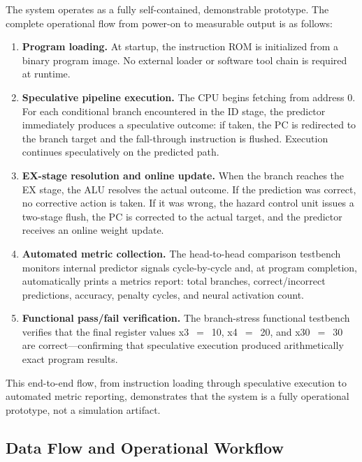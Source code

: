 \documentclass[12pt,a4paper]{article}
\begin{document}
The system operates as a fully self-contained, demonstrable prototype. The
complete operational flow from power-on to measurable output is as follows:

\begin{enumerate}
  \item \textbf{Program loading.} At startup, the instruction ROM is initialized
    from a binary program image. No external loader or software tool chain is
    required at runtime.

  \item \textbf{Speculative pipeline execution.} The CPU begins fetching from
    address 0. For each conditional branch encountered in the ID stage, the
    predictor immediately produces a speculative outcome: if taken, the PC is
    redirected to the branch target and the fall-through instruction is flushed.
    Execution continues speculatively on the predicted path.

  \item \textbf{EX-stage resolution and online update.} When the branch reaches
    the EX stage, the ALU resolves the actual outcome. If the prediction was
    correct, no corrective action is taken. If it was wrong, the hazard control
    unit issues a two-stage flush, the PC is corrected to the actual target, and
    the predictor receives an online weight update.

  \item \textbf{Automated metric collection.} The head-to-head comparison
    testbench monitors internal predictor signals cycle-by-cycle and, at program
    completion, automatically prints a metrics report: total branches,
    correct/incorrect predictions, accuracy, penalty cycles, and neural
    activation count.

  \item \textbf{Functional pass/fail verification.} The branch-stress functional
    testbench verifies that the final register values x3~$=$~10, x4~$=$~20,
    and x30~$=$~30 are correct---confirming that speculative execution produced
    arithmetically exact program results.
\end{enumerate}

This end-to-end flow, from instruction loading through speculative execution to
automated metric reporting, demonstrates that the system is a fully operational
prototype, not a simulation artifact.

\subsection{Data Flow and Operational Workflow}
\label{sec:dataflow}
\end{document}
